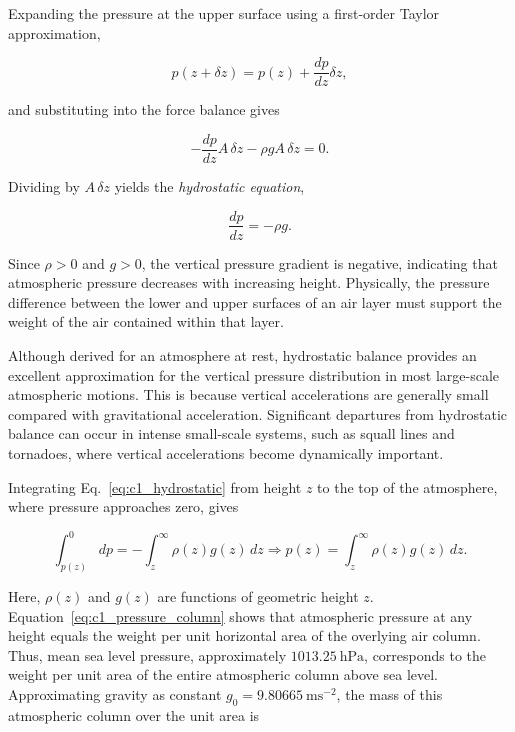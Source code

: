 \documentclass[10pt,twocolumn]{memoir}
\begin{document}
Expanding the pressure at the upper surface using a first-order Taylor approximation,

\begin{equation}
    p(z+\delta z)=p(z) + \frac{dp}{dz}\delta z,
\end{equation}

and substituting into the force balance gives

\begin{equation}
    -\frac{dp}{dz}A\,\delta z-\rho gA\,\delta z=0.
\end{equation}

Dividing by $A\,\delta z$ yields the \textit{hydrostatic equation},

\begin{equation}
    \frac{dp}{dz}=-\rho g.
\label{eq:c1_hydrostatic}
\end{equation}

Since $\rho>0$ and $g>0$, the vertical pressure gradient is negative, indicating that atmospheric pressure decreases with increasing height. Physically, the pressure difference between the lower and upper surfaces of an air layer must support the weight of the air contained within that layer.

Although derived for an atmosphere at rest, hydrostatic balance provides an excellent approximation for the vertical pressure distribution in most large-scale atmospheric motions. This is because vertical accelerations are generally small compared with gravitational acceleration. Significant departures from hydrostatic balance can occur in intense small-scale systems, such as squall lines and tornadoes, where vertical accelerations become dynamically important.

Integrating Eq.~\ref{eq:c1_hydrostatic} from height $z$ to the top of the atmosphere, where pressure approaches zero, gives

\begin{equation}
    \int_{p(z)}^0 dp = -\int_z^\infty \rho(z)g(z)\,dz \Longrightarrow p(z) = \int_z^\infty \rho(z)g(z)\,dz.
\label{eq:c1_pressure_column}
\end{equation}

Here, $\rho(z)$ and $g(z)$ are functions of geometric height $z$. Equation~\ref{eq:c1_pressure_column} shows that atmospheric pressure at any height equals the weight per unit horizontal area of the overlying air column. Thus, mean sea level pressure, approximately $1013.25\ \mathrm{hPa}$, corresponds to the weight per unit area of the entire atmospheric column above sea level. Approximating gravity as constant $g_0 = 9.80665\ \mathrm{ms^{-2}}$, the mass of this atmospheric column over the unit area is
\end{document}
